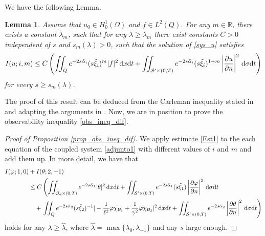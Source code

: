 \documentclass[preprint,10pt]{article}
\newtheorem{lemma}[theorem]{Lemma}
\numberwithin{equation}{section}
\numberwithin{theorem}{section}
\def\dx{\,\textnormal{d}x}
\def\dt{\textnormal{d}t}
\def\d{\,\textnormal{d}}
\newcommand\csin[1]{\chi_{#1}}
\def\dx{\,\textnormal{d}x}
\def\dt{\textnormal{d}t}
\def\d{\,\textnormal{d}}
\begin{document}
{We have the following Lemma.
%
\begin{lemma}\label{lemma_car_boundary}
Assume that $u_0\in H_0^1(\Omega)$ and $f\in L^2(Q)$. For any $m\in \mathbb R$, there exists a constant $\lambda_m$, such that for any $\lambda\geq \lambda_m$ there exist constants $C>0$ independent of $s$ and $s_m(\lambda)>0$, such that the solution of \eqref{sys_u} satisfies
%
\begin{equation}\label{Est1}
I(u;i,m)\leq C\left(\iint_{Q}e^{-2s\tilde{\alpha}_i}(s\tilde{\xi}_i)^m|f|^2\dx\dt+\iint_{\mathcal S^\prime\times(0,T)}e^{-2s\tilde{\alpha}_i}(s\tilde{\xi}_i)^{1+m}\left|\frac{\partial u}{\partial n}\right|^2\d\sigma\dt\right)
\end{equation}
%
for every $s\geq s_m(\lambda)$. 
\end{lemma}
%
The proof of this result can be deduced from the Carleman inequality stated in \cite[Lemma 1.1]{ima_original} and adapting the arguments in \cite[Lemma 2.3]{ima_yama}. Now, we are in position to prove the observability inequality \eqref{obs_ineq_dif}.

\begin{proof}[Proof of Proposition \ref{prop_obs_ineq_dif}]
We apply estimate \eqref{Est1} to the each equation of the coupled system \eqref{adjunto1} with different values of $i$ and $m$ and add them up. In more detail, we have that
%
\begin{align}\notag
I(\varphi;1,0)&+I(\theta;2, -1)\\\notag
&\leq C\left(\iint_{\mathcal O_d\times(0,T)}e^{-2s\tilde{\alpha}_1}|\theta|^2\dx\dt+\iint_{\mathcal S^\prime\times(0,T)}e^{-2s\tilde{\alpha}_1}(s\tilde{\xi}_1)\left|\frac{\partial \varphi}{\partial n}\right|^2\d\sigma\dt\right.\\ \notag
&\quad+\left.\iint_{Q}e^{-2s\tilde{\alpha}_2}(s\tilde{\xi}_2)^{-1}|-\frac{1}{\ell^2}\varphi\csin{\mathcal B_1}+\frac{1}{\gamma^2}\varphi \csin{\mathcal B_2}|^2\dx\dt+\iint_{\mathcal S^\prime\times(0,T)}e^{-2s\tilde{\alpha}_2}\left|\frac{\partial \theta}{\partial n}\right|^2\d\sigma\dt\right)%
\end{align}
%
holds for any $\lambda\geq\hat\lambda$, where $\hat{\lambda}=\max\{\lambda_0,\lambda_{-1}\}$ and any $s$ large enough.


\end{proof}}
\end{document}
